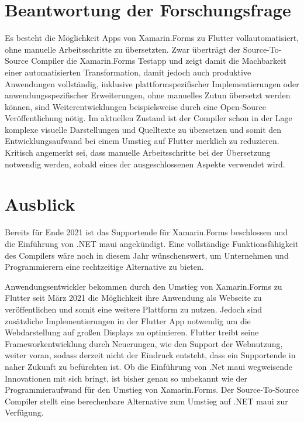 \section{Beantwortung der Forschungsfrage}
Es besteht die Möglichkeit Apps von Xamarin.Forms zu Flutter vollautomatisiert, ohne manuelle 
Arbeitsschritte zu übersetzten. Zwar überträgt der Source-To-Source Compiler die Xamarin.Forms Testapp und zeigt damit die Machbarkeit einer automatisierten Transformation,  damit jedoch auch produktive Anwendungen vollständig, inklusive plattformspezifischer Implementierungen oder 
anwendungsspezifischer Erweiterungen, ohne manuelles Zutun übersetzt werden können,  sind 
Weiterentwicklungen beispielsweise durch eine Open-Source Veröffentlichung nötig.
Im aktuellen Zustand ist der Compiler schon in der Lage komplexe visuelle Darstellungen
und Quelltexte zu übersetzen und somit den Entwicklungsaufwand bei einem Umstieg auf Flutter 
merklich zu reduzieren.
Kritisch angemerkt sei,  dass manuelle Arbeitsschritte bei der Übersetzung notwendig werden,  sobald eines der ausgeschlossenen Aspekte verwendet wird.


\section{Ausblick}
Bereits für Ende 2021 ist das Supportende für Xamarin.Forms beschlossen und die Einführung von 
.NET \ac{maui} angekündigt.  Eine vollständige Funktionsfähigkeit des Compilers wäre noch in diesem Jahr wünschenswert,  um Unternehmen und Programmierern eine rechtzeitige Alternative zu bieten. 

Anwendungsentwickler bekommen durch den Umstieg von Xamarin.Forms zu Flutter seit März 2021 die Möglichkeit ihre Anwendung als Webseite zu veröffentlichen und somit eine weitere Plattform zu nutzen.  Jedoch sind zusätzliche Implementierungen in der Flutter App notwendig um die Webdarstellung auf großen Displays zu optimieren.  Flutter treibt seine Frameworkentwicklung durch Neuerungen, wie den Support der Webnutzung,  weiter voran,  sodass derzeit nicht der 
Eindruck entsteht, dass ein Supportende in naher Zukunft zu befürchten ist. 
Ob die Einführung von .Net \ac{maui} wegweisende Innovationen mit sich bringt,  ist bisher genau so unbekannt wie der Programmieraufwand für den Umstieg von Xamarin.Forms.  Der Source-To-Source Compiler stellt eine berechenbare Alternative zum Umstieg auf .NET  \ac{maui} zur Verfügung. 
